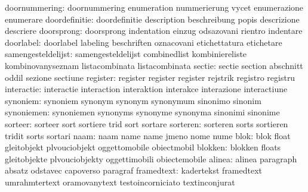            doornummering: doornummering             enumeration
                           nummerierung              vycet
                           enumerazione              enumerare
            doordefinitie: doordefinitie             description
                           beschreibung              popis
                           descrizione               descriere
               doorsprong: doorsprong                indentation
                           einzug                    odsazovani
                           rientro                   indentare
                doorlabel: doorlabel                 labeling
                           beschriften               oznacovani
                           etichettatura             etichetare
       samengesteldelijst: samengesteldelijst        combinedlist
                           kombiniereliste           kombinovanyseznam
                           listacombinata           listacombinata
                   sectie: sectie                    section
                           abschnitt                 oddil
                           sezione                   sectiune
                 register: register                  register
                           register                  rejstrik
                           registro                  registru
               interactie: interactie                interaction
                           interaktion               interakce
                           interazione               interactiune
                 synoniem: synoniem                  synonym
                           synonym                   synonymum
                           sinonimo                  sinonim
               synoniemen: synoniemen                synonyms
                           synonyme                  synonyma
                           sinonimi                  sinonime
                  sorteer: sorteer                   sort
                           sortiere                  trid
                           sort                      sortare %
                 sorteren: sorteren                  sorts
                           sortieren                 tridit
                           sorts                     sortari %
                     naam: naam                      name
                           name                      jmeno
                           nome                      nume
                     blok: blok                      float
                           gleitobjekt               plvouciobjekt
                           oggettomobile             obiectmobil
                  blokken: blokken                   floats
                           gleitobjekte              plvouciobjekty
                           oggettimobili             obiectemobile
                   alinea: alinea                    paragraph
                           absatz                    odstavec
                           capoverso                 paragraf
               framedtext: kadertekst                framedtext
                           umrahmtertext             oramovanytext
                           testoincorniciato         textinconjurat

